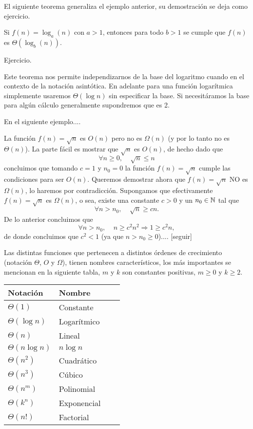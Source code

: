 El siguiente teorema generaliza el ejemplo anterior, su demostración se deja como ejercicio.

\begin{teorema}
Si $f(n)=\log_a(n)$ con $a>1$, entonces para todo $b>1$ se cumple que $f(n)$ es $\Theta(\log_b(n))$.

\begin{demostracion}
Ejercicio.
\end{demostracion}
\end{teorema}

Este teorema nos permite independizarnos de la base del logaritmo cuando en el contexto de la notación asintótica.
En adelante para una función logarítmica simplemente usaremos $\Theta(\log n)$ sin especificar la base.
Si necesitáramos la base para algún cálculo generalmente supondremos que es 2.

En el siguiente ejemplo....

\begin{ejemplo}
La función $f(n)=\sqrt{n}$ es $O(n)$ pero no es $\Omega(n)$ (y por lo tanto no es $\Theta(n)$).
La parte fácil es mostrar que $\sqrt n$ es $O(n)$, de hecho dado que 
\[
\forall n\geq 0,\;\;\;\; \sqrt{n}\leq n
\]
concluimos que tomando $c=1$ y $n_0=0$ la función $f(n)=\sqrt{n}$ cumple las condiciones para ser $O(n)$.
Queremos demostrar ahora que $f(n)=\sqrt n$ NO es $\Omega(n)$, lo haremos por contradicción.
Supongamos que efectivamente $f(n)=\sqrt n$ es $\Omega(n)$, o sea, existe una constante $c>0$ y un $n_0\in\mathbb{N}$ tal que 
\[
\forall n>n_0,\;\;\;\; \sqrt n\geq cn.
\]
De lo anterior concluimos que 
\[
\forall n>n_0,\;\;\;\; n\geq c^2n^2\Rightarrow 1\geq c^2n,
\]
de donde concluimos que $c^2<1$ (ya que $n>n_0\geq 0$).... [seguir]
\end{ejemplo}

Las distintas funciones que pertenecen a distintos órdenes de crecimiento (notación $\Theta$, $O$ y $\Omega$), tienen nombres característicos, los más importantes se mencionan en la siguiente tabla, $m$ y $k$ son constantes positivas, $m\geq 0$ y $k\geq 2$.
\begin{center}
\begin{tabular}{llcc} 
Notación & Nombre \\ \hline
$\Theta(1)$ & Constante \\
$\Theta(\log n)$ & Logarítmico \\
$\Theta(n)$ & Lineal \\
$\Theta(n\log n)$ & $n\log n$ \\
$\Theta(n^2)$ & Cuadrático \\
$\Theta(n^3)$ & Cúbico \\
$\Theta(n^m)$ & Polinomial \\
$\Theta(k^n)$ & Exponencial \\
$\Theta(n!)$ & Factorial\\
\end{tabular}
\end{center}

